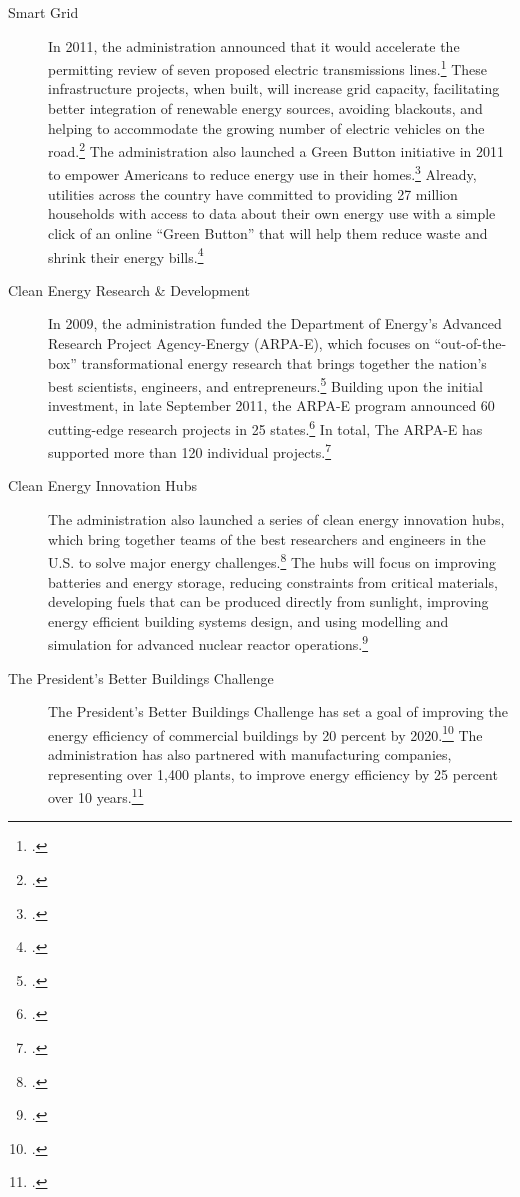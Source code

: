 \documentclass[10pt]{article}
\begin{document}
\begin{description}
	\item [Smart Grid] In 2011, the administration announced that it would accelerate the permitting review of seven proposed electric transmissions lines.\footcite[][]{GridModernization} These infrastructure projects, when built, will increase grid capacity, facilitating better integration of renewable energy sources, avoiding blackouts, and helping to accommodate the growing number of electric vehicles on the road.\footcite[][]{GridModernization} The administration also launched a Green Button initiative in 2011 to empower Americans to reduce energy use in their homes.\footcite[][]{GreenButton} Already, utilities across the country have committed to providing 27 million households with access to data about their own energy use with a simple click of an online ``Green Button'' that will help them reduce waste and shrink their energy bills.\footcite[][]{GreenButton}
	\item [Clean Energy Research \& Development] In 2009, the administration funded the Department of Energy’s Advanced Research Project Agency-Energy (ARPA-E), which focuses on ``out-of-the-box'' transformational energy research that brings together the nation’s best scientists, engineers, and entrepreneurs.\footcite[][]{ARPAE} Building upon the initial investment, in late September 2011, the ARPA-E program announced 60 cutting-edge research projects in 25 states.\footcite[][]{ARPAEProjects} In total, The ARPA-E has supported more than 120 individual projects.\footcite[][]{ARPAEProjects}
	\item [Clean Energy Innovation Hubs] The administration also launched a series of clean energy innovation hubs, which bring together teams of the best researchers and engineers in the U.S. to solve major energy challenges.\footcite[][]{EnergyHubs} The hubs will focus on improving batteries and energy storage, reducing constraints from critical materials, developing fuels that can be produced directly from sunlight, improving energy efficient building systems design, and using modelling and simulation for advanced nuclear reactor operations.\footcite[][]{Hubs}
	\item [The President's Better Buildings Challenge] The President's Better Buildings Challenge has set a goal of improving the energy efficiency of commercial buildings by 20 percent by 2020.\footcite[][]{BetterBuildings} The administration has also partnered with manufacturing companies, representing over 1,400 plants, to improve energy efficiency by 25 percent over 10 years.\footcite[][]{BetterBuildings}
\end{description}	
\end{document}
